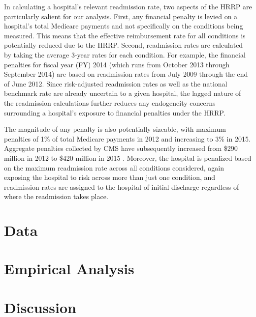 \documentclass[12pt]{article}
\begin{document}
In calculating a hospital's relevant readmission rate, two aspects of the HRRP are particularly salient for our analysis. First, any financial penalty is levied on a hospital's total Medicare payments and not specifically on the conditions being measured. This means that the effective reimbursement rate for all conditions is potentially reduced due to the HRRP. Second, readmission rates are calculated by taking the average 3-year rates for each condition. For example, the financial penalties for fiscal year (FY) 2014 (which runs from October 2013 through September 2014) are based on readmission rates from July 2009 through the end of June 2012. Since risk-adjusted readmission rates as well as the national benchmark rate are already uncertain to a given hospital, the lagged nature of the readmission calculations further reduces any endogeneity concerns surrounding a hospital's exposure to financial penalties under the HRRP.

The magnitude of any penalty is also potentially sizeable, with maximum penalties of 1\% of total Medicare payments in 2012 and increasing to 3\% in 2015. Aggregate penalties collected by CMS have subsequently increased from \$290 million in 2012 to \$420 million in 2015 \citep{mellor2016}. Moreover, the hospital is penalized based on the maximum readmission rate across all conditions considered, again exposing the hospital to risk across more than just one condition, and readmission rates are assigned to the hospital of initial discharge regardless of where the readmission takes place.

\section{Data}
\label{sec:data}

\section{Empirical Analysis}
\label{sec:analysis}

\section{Discussion}
\label{sec:discuss}

\pagebreak


\end{document}

